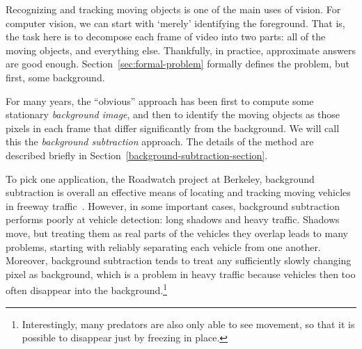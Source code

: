\newcommand{\secref}[1]{Section~\ref{#1}}
\newcommand{\figref}[1]{Figure~\ref{#1}}
\newcommand{\tabref}[1]{Table~\ref{#1}}
\renewcommand{\eqref}[1]{Equation~(\ref{#1})}

\newcommand{\mbf}[1]{\mbox{{\bf #1}}}
\newcommand{\shortcite}{\cite}
\newcommand{\smbf}[1]{\mbox{{\scriptsize\bf #1}}}
\def\w{\mbf{w}}


Recognizing and tracking moving
objects is one of the main uses of vision.
For computer vision, we can start with `merely' identifying the
foreground.
That is, the task here is to decompose
each frame of video into two parts: all of the moving objects, and
everything else.  Thankfully, in practice, approximate answers are
good enough.  \secref{sec:formal-problem} formally defines the problem,
but first, some background.

For many years, the ``obvious'' approach has
been first to compute some stationary {\em background image}, and then to
identify the moving objects as those pixels in each frame that
differ significantly from the background. We will call this the
{\em background subtraction} approach.
The details of the method are described briefly in
\secref{background-subtraction-section}.

To pick one application, the Roadwatch project at Berkeley,
background subtraction is overall an effective means of
locating and tracking moving vehicles in freeway
traffic~\cite{Koller+al:1994}.
However, in some important cases, background subtraction performs
poorly at vehicle detection: long shadows and heavy traffic.
Shadows move, but treating them as real parts of the vehicles they
overlap leads to many problems, starting with reliably separating each
vehicle from one another.
Moreover, background subtraction tends to treat any
sufficiently slowly changing pixel as
background, which is a problem in heavy traffic because vehicles
then too often disappear into the background.\footnote{Interestingly,
  many predators are also only able to see movement, so that
  it is possible to disappear just by freezing in place.}

